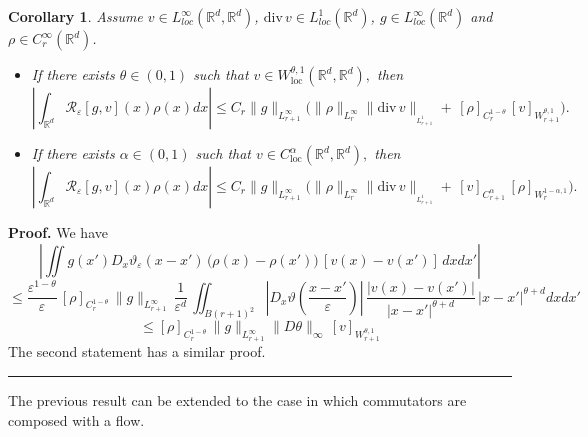 \documentclass{article}
\newtheorem{corollary}[theorem]{Corollary}
\newcommand{\loc}{\mathrm{loc}}
\newcommand{\eps}{\varepsilon}
\newenvironment{proof}[1][Proof]{\noindent\textbf{#1.} }{\ \rule{0.5em}{0.5em}}
\begin{document}
\begin{corollary} \label{ci4} Assume
  $ v    \in L_{loc}^{\infty}\left(
\mathbb{R}^{d},\mathbb{R}^{d}\right) $, ${\mathrm{div}\,}v\in
L_{loc}^{1}\left(  \mathbb{R}^{d}\right)$, $g    \in
L_{loc}^{\infty}\left(  \mathbb{R}^{d}\right)$ and $\rho \in
C_r^{\infty} (  \mathbb{R}^{d})$.
\begin{itemize}
\item[(i)] If
there exists $\theta  \in (0,1)$ such that $
  v \in W_{\loc}^{\theta, 1}(
 \mathbb{R}^{d}, \mathbb{R}^{d}),
$
  then %
$$
\left|\int_{{\mathbb R}^d}\mathcal{R}_{\varepsilon}\left[
g,v\right] (  x) \rho(x) dx \right| \le
 C_r \| g\|_{L^{\infty}_{r+1}} \big( \|
\rho\|_{L^{\infty}_{r}}
 \| {\mathrm{div}\,} v
\|_{_{L_{r+1}^{1}}} +  \, [ \rho ]_{C^{1 - \theta}_{r}} \,
 [v]_{W^{\theta,1}_{r+1}} \big).
$$
\item[(ii)] If  there exists $\alpha  \in (0,1)$ such that
$
   v \in C_{\loc}^{\alpha}( \mathbb{R}^{d}, \mathbb{R}^{d}),
$
 then %
$$
\left|\int_{{\mathbb R}^d}\mathcal{R}_{\varepsilon}\left[
g,v\right] (  x) \rho(x) dx \right| \le
 C_r \| g\|_{L^{\infty}_{r+1}} \big( \|
\rho\|_{L^{\infty}_{r}}
 \| {\mathrm{div}\,} v
\|_{_{L_{r+1}^{1}}} +  \, [ v ]_{C^{\alpha}_{r+1}} \,
 [\rho]_{W^{1- \alpha,1}_r} \big).
$$
\end{itemize}
\end{corollary}
 \begin{proof} We have
$$
  \left|
  \iint g(x') D_x \vartheta_{\eps} ({x-x'}) \,
\big( \rho(x) - \rho(x') \big)\, [v(x)-v(x')] \, dx dx' \right|
$$
$$
\le \frac{\eps^{1 - \theta}}{\eps} \, [ \rho ]_{C^{1 - \theta}_{r}}
\,
 \| g \|_{L^{\infty}_{r+1}}\,
  \frac{1}{\eps^{d}}\,
   \iint_{B(r+1)^2} |D_x \vartheta (\frac{x-x'}{\eps})|  \,
  \frac{|v(x)-v(x')|}{|x-x'|^{\theta + d}} \,
  |x-x'|^{ \theta + d}  dx dx'
$$
$$
 \le
  [ \rho ]_{C^{1 - \theta}_{r}}
\,
 \| g \|_{L^{\infty}_{r+1}}
  \| D \theta \|_{\infty}\, [v]_{W^{\theta,1}_{r+1}}
$$
The second statement has a similar proof.
\end{proof}

The previous result can be extended to the case in which commutators
are composed with  a flow.
\end{document}
